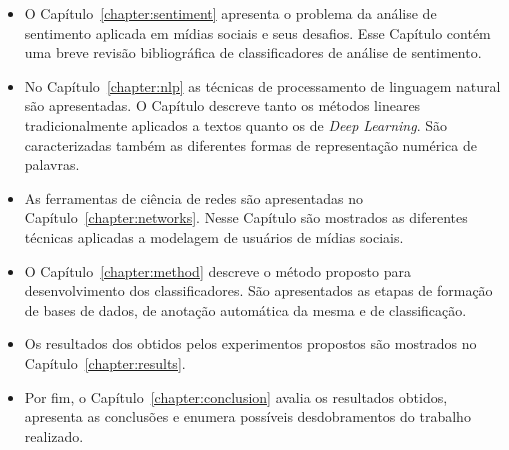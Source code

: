 \begin{itemize}
    \item O Capítulo~\ref{chapter:sentiment} apresenta o problema da análise
        de sentimento aplicada em mídias sociais e seus desafios.
        Esse Capítulo contém uma breve revisão bibliográfica de classificadores
        de análise de sentimento.
    \item No Capítulo~\ref{chapter:nlp} as técnicas de processamento de
        linguagem natural são apresentadas.
        O Capítulo descreve tanto os métodos lineares tradicionalmente
        aplicados a textos quanto os de \textit{Deep Learning}.
        São caracterizadas também as diferentes formas de representação numérica
        de palavras.
    \item As ferramentas de ciência de redes são apresentadas no
        Capítulo~\ref{chapter:networks}.
        Nesse Capítulo são mostrados as diferentes técnicas aplicadas a
        modelagem de usuários de mídias sociais.
    \item O Capítulo~\ref{chapter:method} descreve o método proposto para
        desenvolvimento dos classificadores.
        São apresentados as etapas de formação de bases de dados, de anotação
        automática da mesma e de classificação.
    \item Os resultados dos obtidos pelos experimentos propostos são mostrados
        no Capítulo~\ref{chapter:results}.
    \item Por fim, o Capítulo~\ref{chapter:conclusion} avalia os resultados
        obtidos, apresenta as conclusões e enumera possíveis desdobramentos do
        trabalho realizado.
\end{itemize}
